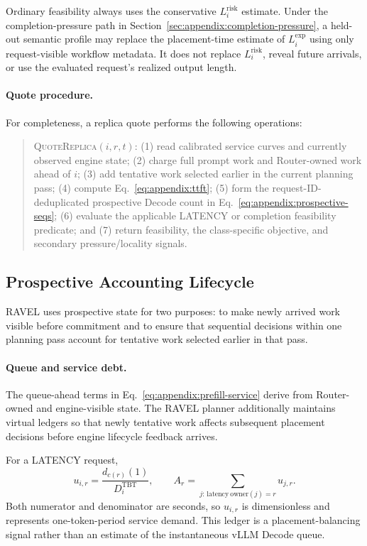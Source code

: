 \documentclass[letterpaper,twocolumn,10pt]{article}
\begin{document}
Ordinary feasibility always uses the conservative
$L_i^{\mathrm{risk}}$ estimate.
Under the completion-pressure path in
Section~\ref{sec:appendix:completion-pressure}, a held-out semantic profile may
replace the placement-time estimate of $L_i^{\mathrm{exp}}$ using only
request-visible workflow metadata.
It does not replace $L_i^{\mathrm{risk}}$, reveal future arrivals, or use the
evaluated request's realized output length.

\paragraph{Quote procedure.}
For completeness, a replica quote performs the following operations:
\begin{quote}
\textsc{QuoteReplica}$(i,r,t)$:
(1) read calibrated service curves and currently observed engine state;
(2) charge full prompt work and Router-owned work ahead of $i$;
(3) add tentative work selected earlier in the current planning pass;
(4) compute Eq.~\ref{eq:appendix:ttft};
(5) form the request-ID-deduplicated prospective Decode count in
Eq.~\ref{eq:appendix:prospective-seqs};
(6) evaluate the applicable LATENCY or completion feasibility predicate; and
(7) return feasibility, the class-specific objective, and secondary
pressure/locality signals.
\end{quote}


\subsection{Prospective Accounting Lifecycle}
\label{sec:appendix:accounting}

RAVEL uses prospective state for two purposes: to make newly arrived work
visible before commitment and to ensure that sequential decisions within one
planning pass account for tentative work selected earlier in that pass.

\paragraph{Queue and service debt.}
The queue-ahead terms in Eq.~\ref{eq:appendix:prefill-service} derive from
Router-owned and engine-visible state.
The RAVEL planner additionally maintains virtual ledgers so that newly
tentative work affects subsequent placement decisions before engine lifecycle
feedback arrives.

For a LATENCY request,
\begin{equation}
    u_{i,r}
    =
    \frac{d_{c(r)}(1)}
         {D_i^{\mathrm{TBT}}},
    \qquad
    A_r
    =
    \sum_{j:\,\mathrm{latency\ owner}(j)=r}u_{j,r}.
    \label{eq:appendix:latency-ledger}
\end{equation}
Both numerator and denominator are seconds, so $u_{i,r}$ is dimensionless and
represents one-token-period service demand.
This ledger is a placement-balancing signal rather than an estimate of the
instantaneous vLLM Decode queue.
\end{document}
